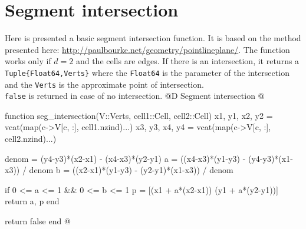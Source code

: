 \documentclass[10pt,oneside]{article}
\begin{document}
\section{Segment intersection}
\label{seg_intersection}
Here is presented a basic segment intersection function.
It is based on the method presented here: \url{http://paulbourke.net/geometry/pointlineplane/}.
The function works only if $d=2$ and the cells are edges.
If there is an intersection, it returns a \texttt{Tuple\{Float64,Verts\}} where 
the \texttt{Float64} is the parameter of the intersection and the \texttt{Verts} 
is the approximate point of intersection. \\
\texttt{false} is returned in case of no intersection.
@D Segment intersection
@{function seg_intersection(V::Verts, cell1::Cell, cell2::Cell)
    x1, y1, x2, y2 = vcat(map(c->V[c, :], cell1.nzind)...)
    x3, y3, x4, y4 = vcat(map(c->V[c, :], cell2.nzind)...)
    
    denom = (y4-y3)*(x2-x1) - (x4-x3)*(y2-y1)
    a = ((x4-x3)*(y1-y3) - (y4-y3)*(x1-x3)) / denom
    b = ((x2-x1)*(y1-y3) - (y2-y1)*(x1-x3)) / denom

    if 0 <= a <= 1 && 0 <= b <= 1
        p = [(x1 + a*(x2-x1))  (y1 + a*(y2-y1))]
        return a, p
    end

    return false
end
@}

\end{document}
